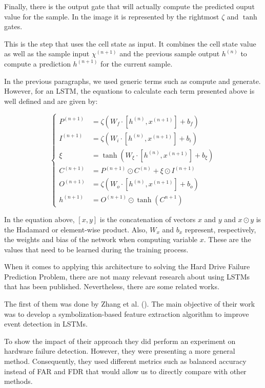 Finally, there is the output gate that will actually compute the predicted ouput value for the sample.
In the image it is represented by the rightmost $\zeta$ and $\tanh$ gates.

This is the step that uses the cell state as input.
It combines the cell state value as well as the sample input $\chi^{(n+1)}$ and the previous sample output $h^{(n)}$ to compute a prediction $h^{(n+1)}$ for the current sample. 

In the previous paragraphs, we used generic terms such as compute and generate.
However, for an LSTM, the equations to calculate each term presented above is well defined and are given by:

\begin{equation}\label{eq:lstm_calculations}
    \begin{cases}
        P^{(n+1)} &= \zeta(W_f\cdot[h^{(n)}, x^{(n+1)}] + b_f) \\
        I^{(n+1)} &= \zeta(W_i\cdot[h^{(n)}, x^{(n+1)}] + b_i) \\
        \xi &= \tanh(W_\xi\cdot[h^{(n)}, x^{(n+1)}] + b_\xi) \\
        C^{(n+1)} &= P^{(n+1)} \odot C^{(n)} + \xi \odot I^{(n+1)} \\
        O^{(n+1)} &= \zeta(W_o\cdot[h^{(n)}, x^{(n+1)}] + b_o) \\
        h^{(n+1)} &= O^{(n+1)} \odot \tanh(C^{n+1})
    \end{cases}
\end{equation}

In the equation above, $[x, y]$ is the concatenation of vectors $x$ and $y$ and $x \odot y$ is the Hadamard or element-wise product.
Also, $W_x$ and $b_x$ represent, respectively, the weights and bias of the network when computing variable $x$.
These are the values that need to be learned during the training process.

When it comes to applying this architecture to solving the Hard Drive Failure Prediction Problem, there are not many relevant research about using LSTMs that has been published.
Nevertheless, there are some related works.

The first of them was done by Zhang et al. (\cite{zhang2017deep}).
The main objective of their work was to develop a symbolization-based feature extraction algorithm to improve event detection in LSTMs.

To show the impact of their approach they did perform an experiment on hardware failure detection.
However, they were presenting a more general method.
Consequently, they used different metrics such as balanced accuracy instead of FAR and FDR that would allow us to directly compare with other methods.

